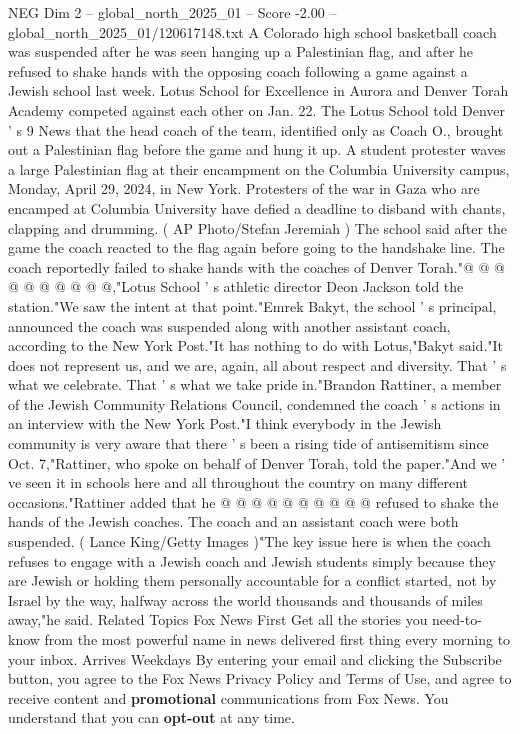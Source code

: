 \begin{textsample}{NEG Dim 2 – global\_north\_2025\_01 – Score -2.00 – global\_north\_2025\_01/120617148.txt}  \label{ex:f2_neg_082}
A Colorado high school basketball coach was suspended after he was seen hanging up a Palestinian flag, and after he refused to shake hands with the opposing coach following a game against a Jewish school last week.
Lotus School for Excellence in Aurora and Denver Torah Academy competed against each other on Jan. 22.
The Lotus School told Denver ' s 9 News that the head coach of the team, identified only as Coach O., brought out a Palestinian flag before the game and hung it up.
A student protester waves a large Palestinian flag at their encampment on the Columbia University campus, Monday, April 29, 2024, in New York.
Protesters of the war in Gaza who are encamped at Columbia University have defied a deadline to disband with chants, clapping and drumming. ( AP Photo/Stefan Jeremiah ) The school said after the game the coach reacted to the flag again before going to the handshake line.
The coach reportedly failed to shake hands with the coaches of Denver Torah."@ @ @ @ @ @ @ @ @ @,"Lotus School ' s athletic director Deon Jackson told the station."We saw the intent at that point."Emrek Bakyt, the school ' s principal, announced the coach was suspended along with another assistant coach, according to the New York Post."It has nothing to do with Lotus,"Bakyt said."It does not represent us, and we are, again, all about respect and diversity.
That ' s what we celebrate.
That ' s what we take pride in."Brandon Rattiner, a member of the Jewish Community Relations Council, condemned the coach ' s actions in an interview with the New York Post."I think everybody in the Jewish community is very aware that there ' s been a rising tide of antisemitism since Oct. 7,"Rattiner, who spoke on behalf of Denver Torah, told the paper."And we ' ve seen it in schools here and all throughout the country on many different occasions."Rattiner added that he @ @ @ @ @ @ @ @ @ @ refused to shake the hands of the Jewish coaches.
The coach and an assistant coach were both suspended. ( Lance King/Getty Images )"The key issue here is when the coach refuses to engage with a Jewish coach and Jewish students simply because they are Jewish or holding them personally accountable for a conflict started, not by Israel by the way, halfway across the world thousands and thousands of miles away,"he said.
Related Topics Fox News First Get all the stories you need-to-know from the most powerful name in news delivered first thing every morning to your inbox.
Arrives Weekdays By entering your email and clicking the Subscribe button, you agree to the Fox News Privacy Policy and Terms of Use, and agree to receive content and \textbf{promotional} communications from Fox News.
You understand that you can \textbf{opt-out} at any time.

\end{textsample}
